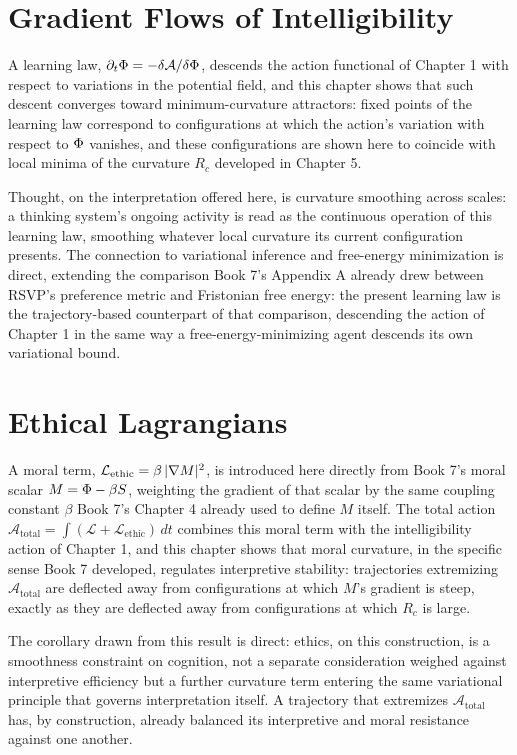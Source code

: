 \chapter{Gradient Flows of Intelligibility}

A learning law, $\partial_t \Phi = -\delta \mathcal{A} / \delta \Phi$, descends the action functional of Chapter 1 with respect to variations in the potential field, and this chapter shows that such descent converges toward minimum-curvature attractors: fixed points of the learning law correspond to configurations at which the action's variation with respect to $\Phi$ vanishes, and these configurations are shown here to coincide with local minima of the curvature $R_c$ developed in Chapter 5.

Thought, on the interpretation offered here, is curvature smoothing across scales: a thinking system's ongoing activity is read as the continuous operation of this learning law, smoothing whatever local curvature its current configuration presents. The connection to variational inference and free-energy minimization is direct, extending the comparison Book 7's Appendix A already drew between RSVP's preference metric and Fristonian free energy: the present learning law is the trajectory-based counterpart of that comparison, descending the action of Chapter 1 in the same way a free-energy-minimizing agent descends its own variational bound.

\chapter{Ethical Lagrangians}

A moral term, $\mathcal{L}_{\text{ethic}} = \beta \, |\nabla M|^2$, is introduced here directly from Book 7's moral scalar $M = \Phi - \beta S$, weighting the gradient of that scalar by the same coupling constant $\beta$ Book 7's Chapter 4 already used to define $M$ itself. The total action $\mathcal{A}_{\text{total}} = \int (\mathcal{L} + \mathcal{L}_{\text{ethic}})\, dt$ combines this moral term with the intelligibility action of Chapter 1, and this chapter shows that moral curvature, in the specific sense Book 7 developed, regulates interpretive stability: trajectories extremizing $\mathcal{A}_{\text{total}}$ are deflected away from configurations at which $M$'s gradient is steep, exactly as they are deflected away from configurations at which $R_c$ is large.

The corollary drawn from this result is direct: ethics, on this construction, is a smoothness constraint on cognition, not a separate consideration weighed against interpretive efficiency but a further curvature term entering the same variational principle that governs interpretation itself. A trajectory that extremizes $\mathcal{A}_{\text{total}}$ has, by construction, already balanced its interpretive and moral resistance against one another.


